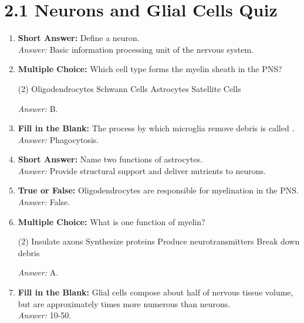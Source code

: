 
\section*{2.1 Neurons and Glial Cells Quiz}
\begin{enumerate}[label=\textbf{Q2.1.\arabic*}]
    \item \textbf{Short Answer:} Define a neuron. \\
          \textit{Answer:} Basic information processing unit of the nervous system.
    \item \textbf{Multiple Choice:} Which cell type forms the myelin sheath in the PNS?
          \begin{tasks}[label=(\Alph*), label-width=1.5em, item-indent=1.7em](2)
               \task Oligodendrocytes
               \task Schwann Cells
               \task Astrocytes
               \task Satellite Cells
          \end{tasks}
          \textit{Answer:} B.
    \item \textbf{Fill in the Blank:} The process by which microglia remove debris is called \underline{\hspace{3cm}}. \\
          \textit{Answer:} Phagocytosis.
    \item \textbf{Short Answer:} Name two functions of astrocytes. \\
          \textit{Answer:} Provide structural support and deliver nutrients to neurons.
    \item \textbf{True or False:} Oligodendrocytes are responsible for myelination in the PNS. \\
          \textit{Answer:} False.
    \item \textbf{Multiple Choice:} What is one function of myelin?
          \begin{tasks}[label=(\Alph*), label-width=1.5em, item-indent=1.7em](2)
               \task Insulate axons
               \task Synthesize proteins
               \task Produce neurotransmitters
               \task Break down debris
          \end{tasks}
          \textit{Answer:} A.
    \item \textbf{Fill in the Blank:} Glial cells compose about half of nervous tissue volume, but are approximately \underline{\hspace{3cm}} times more numerous than neurons. \\
          \textit{Answer:} 10-50.
    

\end{enumerate}

